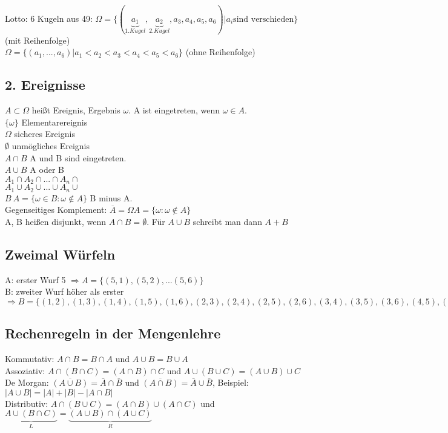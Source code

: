 Lotto: 6 Kugeln aus 49: $ \Omega=\{(\underbrace{a_1}_{1. Kugel}, \underbrace{a_2}_{2. Kugel}, a_3, a_4, a_5, a_6) | a_i \textrm{sind verschieden} \}$ (mit Reihenfolge)\\
$ \Omega=\{(a_1,...,a_6) | a_1 < a_2 < a_3 < a_4 < a_5 < a_6\}$ (ohne Reihenfolge)\\

\subsection{2. Ereignisse}
$ A \subset \Omega$ heißt Ereignis, Ergebnis $ \omega $. A ist eingetreten, wenn $\omega \in A$. \\
$\{\omega\} $ Elementarereignis\\
$ \Omega $ sicheres Ereignis\\
$\emptyset $ unmögliches Ereignis\\
$A \cap B$ A und B sind eingetreten.\\
$A\cup B$ A oder B\\
$A_1\cap A_2\cap ... \cap A_n\cap$\\
$A_1\cup A_2\cup ... \cup A_n\cup$\\
$B \ A= \{\omega \in B : \omega \notin A \} $ B minus A. \\
Gegenseitiges Komplement: $ \overline{A} = \Omega A = \{\omega : \omega \notin A \}$\\
A, B heißen disjunkt, wenn $ A \cap B = \emptyset $. Für $ A \cup B $ schreibt man dann $A+B$\\

\subsection{Zweimal Würfeln}
A: erster Wurf 5 $\Rightarrow A=\{(5,1),(5,2),...(5,6)\}$\\
B: zweiter Wurf höher als erster $\Rightarrow B = \{(1,2),(1,3),(1,4),(1,5),(1,6),(2,3),(2,4),(2,5),(2,6),(3,4),(3,5),(3,6),(4,5),(4,6),(5,6),\} $

\subsection{Rechenregeln in der Mengenlehre}
Kommutativ: $ A\cap B = B\cap A $ und $ A\cup B = B\cup A $\\
Assoziativ: $ A\cap (B\cap C) = (A\cap B) \cap C$ und $ A\cup (B\cup C) = (A\cup B) \cup C$ \\
De Morgan: $ \overline{(A\cup B)} = \bar{A}\cap \bar{B} $ und $ \overline{(A\cap B)} = \bar{A} \cup \bar{B}$, Beispiel: $ |A\cup B| = |A|+|B|-|A\cap B|$ \\
Distributiv: $ A \cap (B\cup C) = (A\cap B)\cup (A\cap C)$ und $ \underbrace{A\cup (B\cap C)}_{L} = \underbrace{(A\cup B) \cap (A\cup C)}_{R}$

